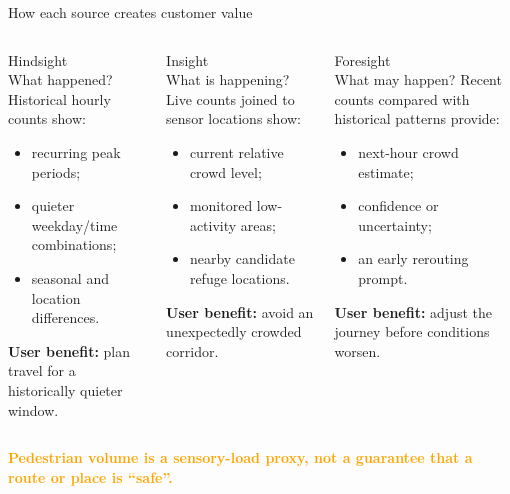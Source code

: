 \documentclass[aspectratio=169,11pt]{beamer}
\begin{document}
\begin{frame}{How each source creates customer value}
  \small
  \begin{columns}[T,onlytextwidth]
      \begin{block}{Hindsight\\What happened?}
        Historical hourly counts show:
        \begin{itemize}
          \item recurring peak periods;
          \item quieter weekday/time combinations;
          \item seasonal and location differences.
        \end{itemize}
        \textbf{User benefit:} plan travel for a historically quieter window.
      \end{block}

      \begin{block}{Insight\\What is happening?}
        Live counts joined to sensor locations show:
        \begin{itemize}
          \item current relative crowd level;
          \item monitored low-activity areas;
          \item nearby candidate refuge locations.
        \end{itemize}
        \textbf{User benefit:} avoid an unexpectedly crowded corridor.
      \end{block}

      \begin{block}{Foresight\\What may happen?}
        Recent counts compared with historical patterns provide:
        \begin{itemize}
          \item next-hour crowd estimate;
          \item confidence or uncertainty;
          \item an early rerouting prompt.
        \end{itemize}
        \textbf{User benefit:} adjust the journey before conditions worsen.
      \end{block}
  \end{columns}

  \vspace{0.25em}
  \begin{center}
    \textcolor{orange}{\textbf{Pedestrian volume is a sensory-load proxy, not a
    guarantee that a route or place is ``safe''.}}
  \end{center}
\end{frame}
\end{document}
